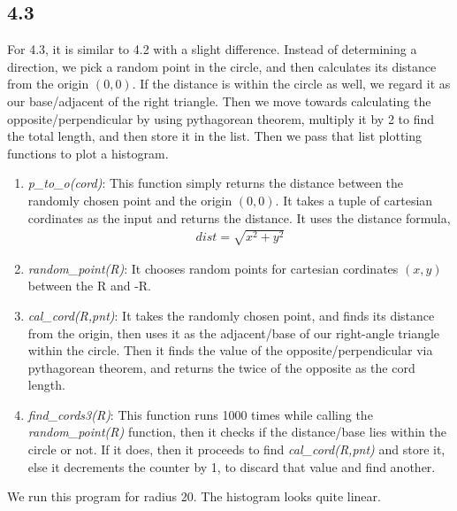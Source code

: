 \documentclass[answers]{exam}
\begin{document}
  \subsection*{4.3}
    \begin{framed}
        For 4.3, it is similar to 4.2 with a slight difference. Instead of determining a direction, we pick a random point in the circle, and then calculates its distance from the origin $(0,0)$. If the distance is within the circle as well, we regard it as our base/adjacent of the right triangle. Then we move towards calculating the opposite/perpendicular by using pythagorean theorem, multiply it by 2 to find the total length, and then store it in the list. Then we pass that list plotting functions to plot a histogram.
        \begin{enumerate}
            \item \emph{p\_to\_o(cord)}: This function simply returns the distance between the randomly chosen point and the origin $(0,0)$. It takes a tuple of cartesian cordinates as the input and returns the distance. It uses the distance formula,
                \begin{align*}
                    dist=\sqrt{x^2+y^2}
                \end{align*}
            \item \emph{random\_point(R)}: It chooses random points for cartesian cordinates $(x,y)$ between the R and -R.
            \item \emph{cal\_cord(R,pnt)}: It takes the randomly chosen point, and finds its distance from the origin, then uses it as the adjacent/base of our right-angle triangle within the circle. Then it finds the value of the opposite/perpendicular via pythagorean theorem, and returns the twice of the opposite as the cord length.
            \item \emph{find\_cords3(R)}: This function runs 1000 times while calling the \emph{random\_point(R)} function, then it checks if the distance/base lies within the circle or not. If it does, then it proceeds to find \emph{cal\_cord(R,pnt)} and store it, else it decrements the counter by 1, to discard that value and find another.
        \end{enumerate}
        We run this program for radius 20. The histogram looks quite linear.
    \end{framed}
    
\end{document}
